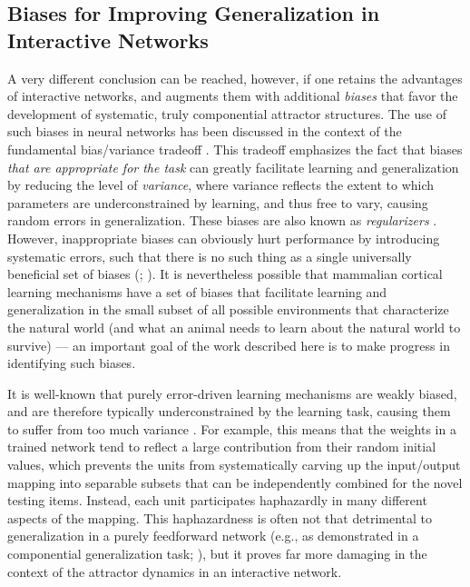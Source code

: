 \documentclass[12pt,twoside]{article}
\begin{document}
\subsection{Biases for Improving Generalization in Interactive Networks}

A very different conclusion can be reached, however, if one retains
the advantages of interactive networks, and augments them with
additional {\em biases} that favor the development of systematic,
truly componential attractor structures.  The use of such biases in
neural networks has been discussed in the context of the fundamental
bias/variance tradeoff \cite{GemanBienenstockDoursat92}.  This
tradeoff emphasizes the fact that biases {\em that are appropriate for
  the task} can greatly facilitate learning and generalization by
reducing the level of {\em variance}, where variance reflects the
extent to which parameters are underconstrained by learning, and thus
free to vary, causing random errors in generalization.  These biases
are also known as {\em regularizers} \cite[e.g.,]{PoggioGirosi90}.
However, inappropriate biases can obviously hurt performance by
introducing systematic errors, such that there is no such thing as a
single universally beneficial set of biases (;
).  It is nevertheless possible that mammalian
cortical learning mechanisms have a set of biases that facilitate
learning and generalization in the small subset of all possible
environments that characterize the natural world (and what an animal
needs to learn about the natural world to survive) --- an important
goal of the work described here is to make progress in identifying
such biases.

It is well-known that purely error-driven learning mechanisms are
weakly biased, and are therefore typically underconstrained by the
learning task, causing them to suffer from too much variance
\cite[e.g.,]{VapnickChervonenkis71,WeigendRumelhartHuberman91,GemanBienenstockDoursat92,Wolpert92}.
For example, this means that the weights in a trained network tend to
reflect a large contribution from their random initial values, which
prevents the units from systematically carving up the input/output
mapping into separable subsets that can be independently combined for
the novel testing items.  Instead, each unit participates haphazardly
in many different aspects of the mapping.  This haphazardness is often
not that detrimental to generalization in a purely feedforward network
(e.g., as demonstrated in a componential generalization task;
), but it proves far more damaging in the context
of the attractor dynamics in an interactive network.
\end{document}
